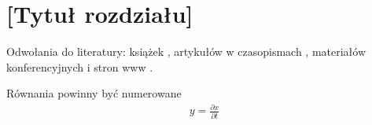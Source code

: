\chapter{[Tytuł rozdziału]}

Odwołania do literatury: 
książek \cite{bib:ksiazka},
artykułów w czasopismach \cite{bib:artykul}, 
materiałów konferencyjnych \cite{bib:konferencja}
i stron www \cite{bib:internet}.

Równania powinny być numerowane
\begin{align}
y = \frac{\partial x}{\partial t}
\end{align}

%
%
